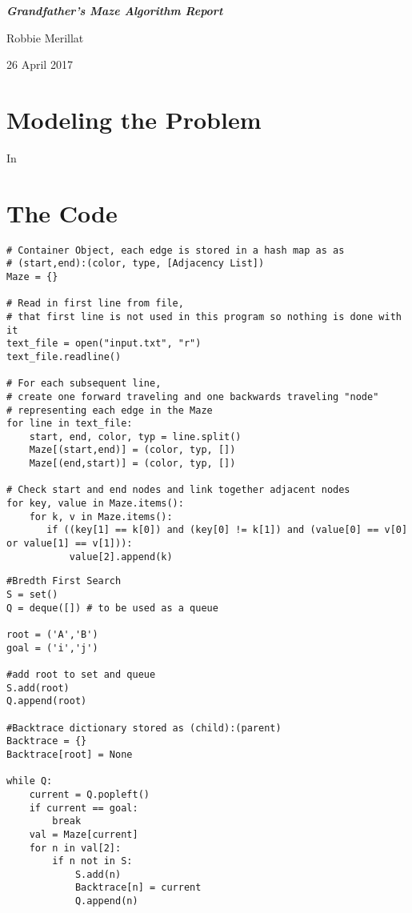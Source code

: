 \documentclass[11pt]{article}
\newcommand\tab[1][.5in]{\hspace*{#1}}
\begin{document}
\begin{titlepage}
\vspace*{\fill}
{
    \centering
    \bfseries
    \emph{\Huge Grandfather's Maze Algorithm Report}
    \vskip 1.5in

    \Large Robbie Merillat \\
    \vskip 2in

    26 April 2017

}
\vspace*{\fill}
\clearpage
\end{titlepage}

\section{Modeling the Problem}
\tab In 
\newpage
\section{The Code}
\begin{lstlisting}[caption= Maze Model]
# Container Object, each edge is stored in a hash map as as 
# (start,end):(color, type, [Adjacency List])
Maze = {}

# Read in first line from file,
# that first line is not used in this program so nothing is done with it
text_file = open("input.txt", "r")
text_file.readline()

# For each subsequent line, 
# create one forward traveling and one backwards traveling "node" 
# representing each edge in the Maze
for line in text_file:
    start, end, color, typ = line.split()
    Maze[(start,end)] = (color, typ, [])
    Maze[(end,start)] = (color, typ, [])

# Check start and end nodes and link together adjacent nodes
for key, value in Maze.items():
    for k, v in Maze.items():
       if ((key[1] == k[0]) and (key[0] != k[1]) and (value[0] == v[0] or value[1] == v[1])):
           value[2].append(k)

\end{lstlisting}
\begin{lstlisting}[caption=BFS]
#Bredth First Search
S = set()
Q = deque([]) # to be used as a queue

root = ('A','B')
goal = ('i','j')

#add root to set and queue
S.add(root)
Q.append(root)

#Backtrace dictionary stored as (child):(parent)
Backtrace = {}
Backtrace[root] = None

while Q:
    current = Q.popleft()
    if current == goal:
        break
    val = Maze[current]
    for n in val[2]:
        if n not in S:
            S.add(n)
            Backtrace[n] = current
            Q.append(n)
\end{lstlisting}
\end{document}
